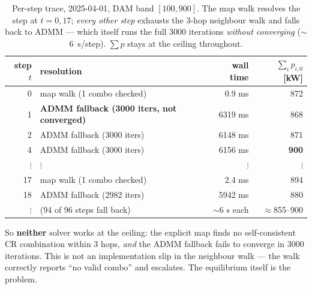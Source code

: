 \documentclass[11pt, letterpaper]{article}
\begin{document}
\begin{table}[H]\centering\small
\caption{Per-step trace, 2025-04-01, DAM band $[100,900]$. The map walk resolves the step at
$t=0,17$; \emph{every other step} exhausts the 3-hop neighbour walk and falls back to ADMM --- which
itself runs the full 3000 iterations \emph{without converging} ($\sim$6~s/step). $\sum p$ stays at
the ceiling throughout.}
\label{tab:step}
\begin{tabular}{r l r r}
\toprule
step $t$ & resolution & wall time & $\sum_i p_{i,0}$ [kW]\\
\midrule
0  & map walk (1 combo checked)          & 0.9 ms   & 872\\
1  & \textbf{ADMM fallback (3000 iters, not converged)} & 6319 ms  & 868\\
2  & ADMM fallback (3000 iters)          & 6148 ms  & 871\\
4  & ADMM fallback (3000 iters)          & 6156 ms  & \textbf{900}\\
$\vdots$ & $\vdots$ & $\vdots$ & $\vdots$\\
17 & map walk (1 combo checked)          & 2.4 ms   & 894\\
18 & ADMM fallback (2982 iters)          & 5942 ms  & 880\\
$\vdots$ & (94 of 96 steps fall back)    & $\sim$6 s each & $\approx$855--900\\
\bottomrule
\end{tabular}
\end{table}

So \textbf{neither} solver works at the ceiling: the explicit map finds no self-consistent CR
combination within 3 hops, \emph{and} the ADMM fallback fails to converge in 3000 iterations. This is
not an implementation slip in the neighbour walk --- the walk correctly reports ``no valid combo''
and escalates. The equilibrium itself is the problem.

\end{document}
